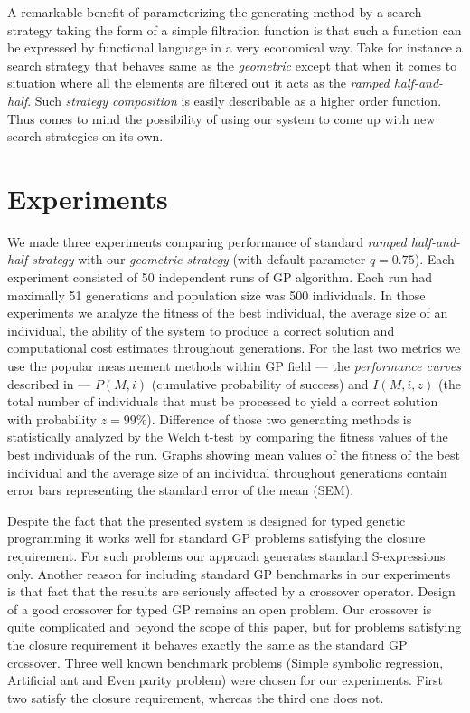 \documentclass[conference]{IEEEtran}
\begin{document}
A remarkable benefit of parameterizing the generating method 
by a search strategy taking the form of a simple filtration function
is that such a function can be expressed by functional language in a very 
economical way. Take for instance a search strategy that behaves same
as the \textit{geometric} except that when it comes to 
situation where all the elements are filtered out it
acts as the \textit{ramped half-and-half}. 
Such \textit{strategy composition}
is easily describable as a higher order function. Thus comes 
to mind the possibility of using our system to come up with new
search strategies on its own.

\section{Experiments}
\label{experiments}

We made three experiments comparing performance of standard 
\textit{ramped half-and-half strategy} with our
\textit{geometric strategy} (with default parameter $q=0.75$). 
Each experiment consisted of 50 independent runs 
of GP algorithm. Each run had maximally 51 generations and population size
was 500 individuals.
In those experiments we analyze the fitness of the best individual,
the average size of an individual,
the ability of the system to produce a correct solution 
and computational cost estimates throughout generations. 
For the last two metrics we use the popular measurement  
methods within GP field --- the \textit{performance curves}
described in \cite{koza92} --- $P(M,i)$ (cumulative probability of success) 
and $I(M,i,z)$ (the total number of individuals that must be processed 
to yield a correct solution with probability $z =99\%$).
Difference of those two generating methods 
is statistically analyzed by the Welch t-test
by comparing the fitness values of the best individuals of the run. 
Graphs showing mean values of the fitness of the best individual and
the average size of an individual throughout generations
contain error bars representing the standard error of the mean (SEM).

Despite the fact that the presented system is designed
for typed genetic programming it works well for
standard GP problems satisfying the closure requirement. For such problems our approach 
generates standard S-expressions only. 
Another reason for including standard GP
benchmarks in our experiments is that fact that
the results are seriously affected by a crossover 
operator. Design of a good crossover for typed GP
remains an open problem. 
Our crossover is quite complicated and beyond
the scope of this paper, but for problems satisfying
the closure requirement it behaves exactly the same
as the standard GP crossover. 
Three well known benchmark problems
(Simple symbolic regression, Artificial ant and
Even parity problem) were chosen for our experiments.
First two satisfy the closure requirement, 
whereas the third one does not.
\end{document}
